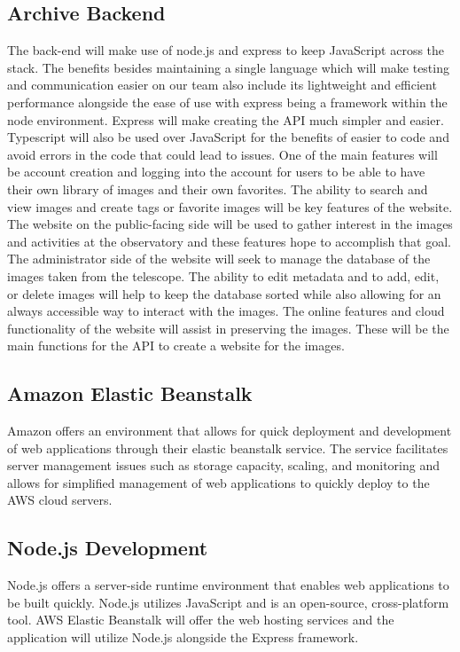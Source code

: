 \documentclass[12pt]{report}
\begin{document}
\begin{enumerate}
\section*{Archive Backend}

The back-end will make use of node.js and express to keep JavaScript across the stack.  The benefits besides maintaining a single language which will make testing and communication easier on our team also include its lightweight and efficient performance alongside the ease of use with express being a framework within the node environment.  Express will make creating the API much simpler and easier.  Typescript will also be used over JavaScript for the benefits of easier to code and avoid errors in the code that could lead to issues.
One of the main features will be account creation and logging into the account for users to be able to have their own library of images and their own favorites.  The ability to search and view images and create tags or favorite images will be key features of the website.  The website on the public-facing side will be used to gather interest in the images and activities at the observatory and these features hope to accomplish that goal.
The administrator side of the website will seek to manage the database of the images taken from the telescope.  The ability to edit metadata and to add, edit, or delete images will help to keep the database sorted while also allowing for an always accessible way to interact with the images.  The online features and cloud functionality of the website will assist in preserving the images.  These will be the main functions for the API to create a website for the images.


\subsection{Amazon Elastic Beanstalk}

Amazon offers an environment that allows for quick deployment and development of web applications through their elastic beanstalk service.  The service facilitates server management issues such as storage capacity, scaling, and monitoring and allows for simplified management of web applications to quickly deploy to the AWS cloud servers.

\subsection{Node.js Development}

Node.js offers a server-side runtime environment that enables web applications to be built quickly.  Node.js utilizes JavaScript and is an open-source, cross-platform tool.  AWS Elastic Beanstalk will offer the web hosting services and the application will utilize Node.js alongside the Express framework.


\end{enumerate}
\end{document}

